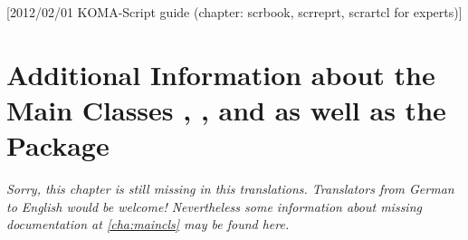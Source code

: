 %
%
%
%
%
%
%
%
% 
%
%
%
%

[2012/02/01 KOMA-Script guide (chapter: scrbook, scrreprt, scrartcl for experts)]

\chapter{Additional Information about the Main Classes 
  ,  , and  
  as well as the Package }


\textit{Sorry, this chapter is still missing in this translations. Translators
  from German to English would be welcome! Nevertheless some information
  about missing documentation at \autoref{cha:maincls} may be found here.}

